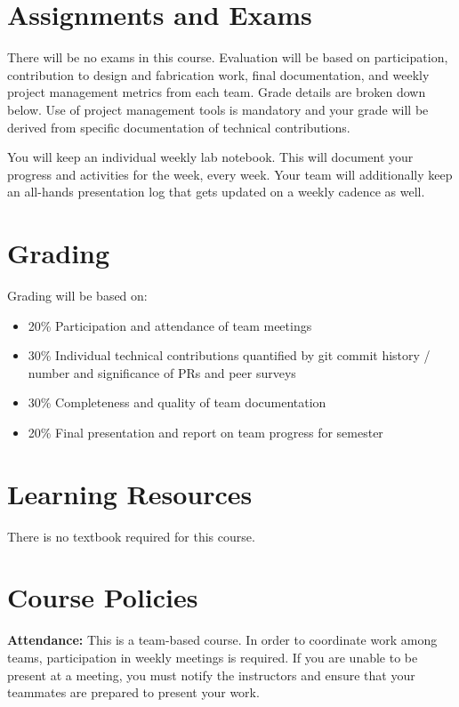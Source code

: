 \documentclass[11pt,letterpaper]{article}
\begin{document}
\section*{Assignments and Exams}

There will be no exams in this course. Evaluation will be based on participation, contribution to design and fabrication work, final documentation, and weekly project management metrics from each team.  Grade details are broken down below.  Use of project management tools is mandatory and your grade will be derived from specific documentation of technical contributions.

You will keep an individual weekly lab notebook.  This will document your progress and activities for the week, every week.  Your team will additionally keep an all-hands presentation log that gets updated on a weekly cadence as well.

\section*{Grading}

Grading will be based on:
\begin{itemize}
	\item 20\% Participation and attendance of team meetings
	\item 30\% Individual technical contributions quantified by git commit history / number and significance of PRs and peer surveys
	\item 30\% Completeness and quality of team documentation
	\item 20\% Final presentation and report on team progress for semester
\end{itemize}


\section*{Learning Resources}

There is no textbook required for this course.

\section*{Course Policies}

\textbf{Attendance:} This is a team-based course. In order to coordinate work among teams, participation in weekly meetings is required. If you are unable to be present at a meeting, you must notify the instructors and ensure that your teammates are prepared to present your work.
\end{document}
